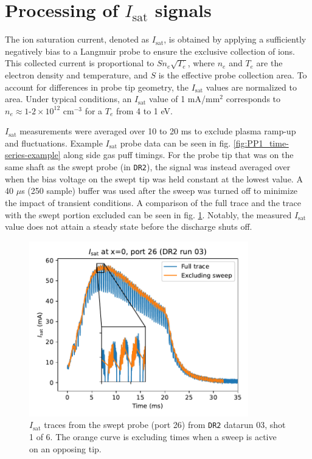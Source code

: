 \section{Processing of $I_\text{sat}$ signals}

The ion saturation current, denoted as $I_\text{sat}$, is obtained by applying a sufficiently negatively bias to a Langmuir probe to ensure the exclusive collection of ions. This collected current is proportional to $S n_e \sqrt{T_e}$, where $n_e$ and $T_e$ are the electron density and temperature, and $S$ is the effective probe collection area. To account for differences in probe tip geometry, the $I_\text{sat}$ values are normalized to area. Under typical conditions, an $I_\text{sat}$ value of 1 mA/mm$^2$ corresponds to $n_e \approx 1\text{-}2\times 10^{12}$ cm$^{-3}$ for a $T_e$ from 4 to 1 eV.

$I_\text{sat}$ measurements were averaged over 10 to 20 ms to exclude plasma ramp-up and fluctuations. Example $I_\text{sat}$ probe data can be seen in fig. \ref{fig:PP1_time-series-example} along side gas puff timings.  For the probe tip that was on the same shaft as the swept probe (in \texttt{DR2}), the signal was instead averaged over when the bias voltage on the swept tip was held constant at the lowest value. A 40 $\mu$s (250 sample) buffer was used after the sweep was turned off to minimize the impact of transient conditions. A comparison of the full trace and the trace with the swept portion excluded can be seen in fig. \ref{fig:PP1_swept_probe}. Notably, the measured $I_\text{sat}$ value does not attain a steady state before the discharge shuts off. 

\begin{figure}
	\centering
	\includegraphics[width=270pt]{figures/PP1_isat_swept_probe.pdf}
	\caption[$I_\text{sat}$ traces from the swept probe]{\label{fig:PP1_swept_probe}$I_\text{sat}$ traces from the swept probe (port 26) from \texttt{DR2} datarun 03, shot 1 of 6. The orange curve is excluding times when a sweep is active on an opposing tip. }
\end{figure}

